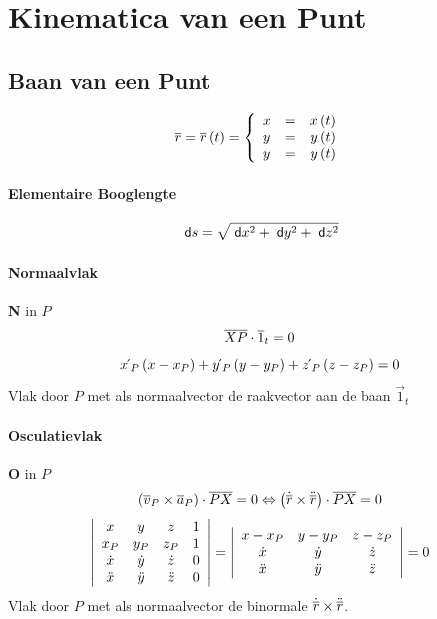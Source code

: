 \newpage
\onecolumn
\section{Kinematica van een Punt}
\label{sec:KinematicaPunt}


\subsection{Baan van een Punt}
\label{sec:BaanPunt}
\[
  \vec{r} = \vec{r}\left( t \right) =
  \left\{
        \begin{array}[h]{lcr}
	       x & = & x\left( t \right)\\
	       y & = & y\left( t \right)\\
	       y & = & y\left( t \right)\\
        \end{array}
  \right.
\]

\paragraph{Elementaire Booglengte}
\label{sec:ElementaireBooglengte}
\[
  \;\textsf{d}s = \sqrt{\;\textsf{d}x^2 + \;\textsf{d}y^2 + \;\textsf{d}z^2}
\]

\paragraph{Normaalvlak} \textbf{N} in $P$
\label{sec:Normaalvlak}
\[
  \overline{XP} \cdot \overline{1}_t = 0
\]
\[
  x \acute{}\,_P \left(x-x_P\right) + y \acute{}\,_P \left(y-y_P\right) + z \acute{}\,_P \left(z-z_P\right) = 0
\]
Vlak door $P$ met als normaalvector de raakvector aan de baan $\vec{1}_t$

\paragraph{Osculatievlak} \textbf{O} in $P$
\label{sec:Osculatievlak}
\[
  \left( \overline{v}_P \times \overline{a}_P \right) \cdot \overline{PX} = 0
  \Leftrightarrow
  \left( \dot{\overline{r}} \times \ddot{\overline{r}} \right) \cdot \overline{PX} = 0
\]
\[
  \left|
    \begin{array}{cccc}
     x       & y       & z       & 1 \\
     x_P     & y_P     & z_P     & 1 \\
     \dot{x}  & \dot{y}  & \dot{z}  & 0 \\
     \ddot{x} & \ddot{y} & \ddot{z} & 0 \\
    \end{array}
  \right|
  =
  \left|
    \begin{array}{ccc}
     x-x_P   & y-y_P   & z - z_P \\
     \dot{x}  & \dot{y}  & \dot{z}  \\
     \ddot{x} & \ddot{y} & \ddot{z} \\
    \end{array}
  \right|
  = 0
\]
Vlak door $P$ met als normaalvector de binormale $\dot{\overline{r}} \times \ddot{\overline{r}} $.

